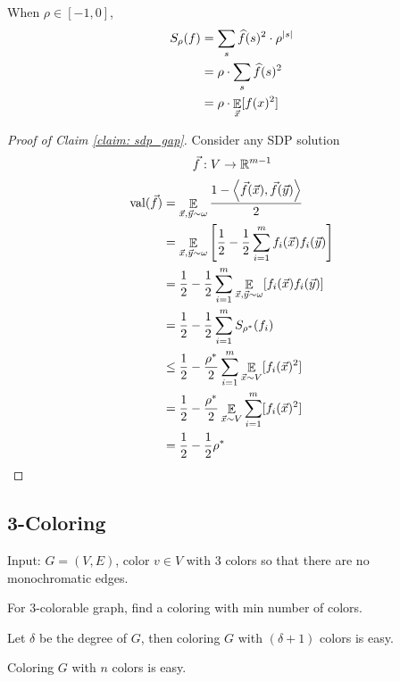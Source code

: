 \begin{claim}
    When  $ \rho\in [-1,0] $, 
    \[\begin{aligned}
        S_\rho(f)&=\sum_{s}\widehat{f}(s)^2\cdot \rho^{|s|}\\
        &=\rho\cdot\sum_{s}\widehat{f}(s)^2\\
        &=\rho \cdot \mathop\mathbb E_{\vec{x}}[f(x)^2]
    \end{aligned}\] 
\end{claim}

\begin{proof}[Proof of Claim \ref{claim: sdp_gap}]
    Consider any  SDP solution 
    \[\vec{f}:V\rightarrow \mathbb R^{m-1}\]
    \[\begin{aligned}
        \mathrm{val}(\vec{f})&=\mathop\mathbb E_{\vec{x},\vec{y}\sim \omega}\frac{1-\left<\vec{f}(\vec{x}),\vec{f}(\vec{y})\right>}{2}\\
        &=\mathop\mathbb E_{\vec{x},\vec{y}\sim \omega}\left[\frac{1}{2}-\frac{1}{2}\sum_{i=1}^mf_i(\vec{x})f_i(\vec{y})\right]\\
        &=\frac{1}{2}-\frac{1}{2}\sum_{i=1}^m\mathop\mathbb E_{\vec{x},\vec{y}\sim \omega}[f_i(\vec{x})f_i(\vec{y})]\\
        &=\frac{1}{2}-\frac{1}{2}\sum_{i=1}^mS_{\rho^*}(f_i)\\
        & \leq \frac{1}{2}-\frac{\rho^*}{2}\sum_{i=1}^m\mathop\mathbb E_{\vec{x}\sim V}[f_i(\vec{x})^2]\\
        &=\frac{1}{2}-\frac{\rho^*}{2}\mathop\mathbb E_{\vec{x}\sim V}\sum_{i=1}^m[f_i(\vec{x})^2]\\
        &=\frac{1}{2}-\frac{1}{2}\rho^*
    \end{aligned}\] 
\end{proof}

\subsection{3-Coloring}
\begin{example}[3-Coloring]
    Input:  $ G=(V,E) $, color  $ v\in V $ with  $ 3 $ colors so that there are no monochromatic edges.
\end{example}
\begin{example}
    For  $ 3 $-colorable graph, find a coloring with min number of colors. 
\end{example}

\begin{lemma}
    Let  $ \delta $ be the degree of  $ G  $, then coloring  $ G  $ with  $ (\delta+1) $ colors is easy.  
\end{lemma}
\begin{claim}
    Coloring  $ G  $ with  $ n  $ colors is easy.
\end{claim}

